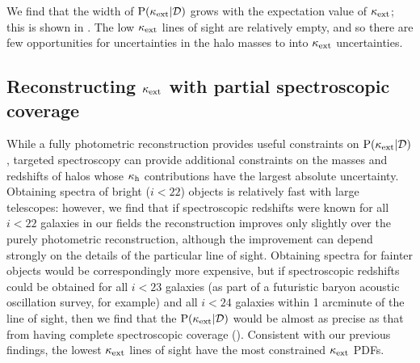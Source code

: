 \documentclass[useAMS,usenatbib,a4paper]{mn2e}
\begin{document}

We find that the width of ${\rm P}(\kappa_{\rm ext}|{\mathcal{D}})$ grows with the expectation
value of $\kappa_{\rm ext}$; this is shown in . The low $\kappa_{\rm ext}$
lines of sight are relatively empty, and so there are few opportunities for
uncertainties in the halo masses to \propogate into $\kappa_{\rm ext}$ uncertainties.

%



\subsection{Reconstructing $\kappa_{\rm ext}$ with partial spectroscopic coverage}
\label{sec:obsMstar+z:targetedspec}

While a fully photometric reconstruction provides useful constraints on
${\rm P}(\kappa_{\rm ext}|{\mathcal{D}})$, targeted spectroscopy can provide additional constraints
on the masses and redshifts of halos whose $\kappa_{\rm h}$ contributions have the
largest absolute uncertainty. Obtaining spectra of bright ($i<22$) objects is
relatively fast with large telescopes: however, we find that if spectroscopic
redshifts were known for all $i<22$ galaxies in our fields the reconstruction
improves only slightly over the purely photometric reconstruction,  although
the improvement can depend strongly on the details of the particular line of
sight. Obtaining spectra for fainter objects would be correspondingly more
expensive, but if spectroscopic redshifts could be obtained for all $i<23$
galaxies (as part of a futuristic baryon acoustic oscillation survey, for
example) and all $i<24$ galaxies within 1 arcminute of the line of sight, then
we find that the ${\rm P}(\kappa_{\rm ext}|{\mathcal{D}})$ would be almost as precise as that from
having complete spectroscopic coverage ().
Consistent with our previous findings, the lowest $\kappa_{\rm ext}$ lines of
sight have the most constrained $\kappa_{\rm ext}$ PDFs.
\end{document}

